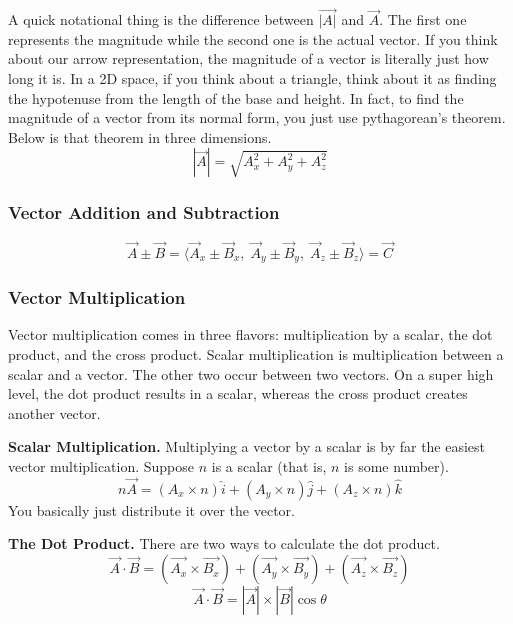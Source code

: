 A quick notational thing is the difference between \( \vec{|A|} \) and \( \vec{A} \). The first one represents the magnitude while the second one
is the actual vector. If you think about our arrow representation, the magnitude of a vector is literally just how long it is. In a 2D space,
if you think about a triangle, think about it as finding the hypotenuse from the length of the base and height. In fact, to find the magnitude
of a vector from its normal form, you just use pythagorean's theorem. Below is that theorem in three dimensions.
\begin{equation}
    |\vec{A}| = \sqrt{A_x^2 + A_y^2 + A_z^2} 
\end{equation}

\subsubsection{Vector Addition and Subtraction}
\begin{equation}
    \vec{A} \pm \vec{B} = \langle \vec{A}_x \pm \vec{B}_x, \; \vec{A}_y \pm \vec{B}_y, \; \vec{A}_z \pm \vec{B}_z \rangle = \vec{C}
\end{equation}

\subsubsection{Vector Multiplication}
Vector multiplication comes in three flavors: multiplication by a scalar, the dot product, and the cross product. Scalar multiplication is multiplication
between a scalar and a vector. The other two occur between two vectors. On a super high level, the dot product results in a scalar, whereas the 
cross product creates another vector.

\noindent \textbf{Scalar Multiplication.} Multiplying a vector by a scalar is by far the easiest vector multiplication. Suppose $n$ is a scalar (that
is, $n$ is some number).
\begin{equation}
    n\vec{A} = (A_x \times n) \hat{i} + (A_y \times n) \hat{j} + (A_z \times n) \hat{k}
\end{equation}
You basically just distribute it over the vector.

\noindent \textbf{The Dot Product.}
There are two ways to calculate the dot product.
\begin{equation}
    \vec{A} \cdot \vec{B} = (\vec{A_x} \times \vec{B_x}) + (\vec{A_y} \times \vec{B_y}) + (\vec{A_z} \times \vec{B_z})
\end{equation}
\begin{equation}
    \vec{A} \cdot \vec{B} = |\vec{A}| \times |\vec{B}|\cos{\theta}
\end{equation}


